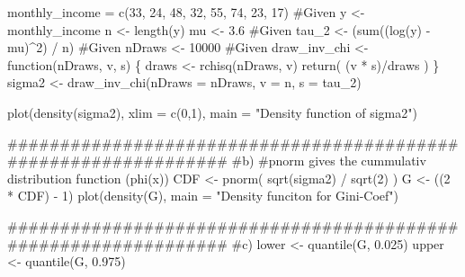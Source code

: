 \documentclass[
]{article}
\author{}
\date{\vspace{-2.5em}}
\newenvironment{Shaded}{\begin{snugshade}}{\end{snugshade}}
\newcommand{\NormalTok}[1]{#1}
\begin{document}
\begin{Shaded}
\begin{Highlighting}[]
\NormalTok{monthly\_income = c(33, 24, 48, 32, 55, 74, 23, 17) \#Given}
\NormalTok{y \textless{}{-} monthly\_income}
\NormalTok{n \textless{}{-} length(y)}
\NormalTok{mu \textless{}{-} 3.6 \#Given}
\NormalTok{tau\_2 \textless{}{-} (sum((log(y) {-} mu)\^{}2) / n) \#Given}
\NormalTok{nDraws \textless{}{-} 10000 \#Given}
\NormalTok{draw\_inv\_chi \textless{}{-} function(nDraws, v, s)}
\NormalTok{\{}
\NormalTok{    draws \textless{}{-} rchisq(nDraws, v)}
\NormalTok{    return( (v * s)/draws )}
\NormalTok{\}}
\NormalTok{sigma2 \textless{}{-} draw\_inv\_chi(nDraws = nDraws, v = n, s = tau\_2)}

\NormalTok{plot(density(sigma2), xlim = c(0,1),}
\NormalTok{     main = "Density function of sigma2")}

\NormalTok{\#\#\#\#\#\#\#\#\#\#\#\#\#\#\#\#\#\#\#\#\#\#\#\#\#\#\#\#\#\#\#\#\#\#\#\#\#\#\#\#\#\#\#\#\#\#\#\#\#\#\#\#\#\#\#\#\#\#\#\#\#\#\#\#}
\NormalTok{\#b)}
\NormalTok{\#pnorm gives the cummulativ distribution function (phi(x))}
\NormalTok{CDF \textless{}{-} pnorm( sqrt(sigma2) / sqrt(2) )}
\NormalTok{G \textless{}{-} ((2 * CDF) {-} 1)}
\NormalTok{plot(density(G), main = "Density funciton for Gini{-}Coef")}


\NormalTok{\#\#\#\#\#\#\#\#\#\#\#\#\#\#\#\#\#\#\#\#\#\#\#\#\#\#\#\#\#\#\#\#\#\#\#\#\#\#\#\#\#\#\#\#\#\#\#\#\#\#\#\#\#\#\#\#\#\#\#\#\#\#\#\#}
\NormalTok{\#c)}
\NormalTok{lower \textless{}{-} quantile(G, 0.025)}
\NormalTok{upper \textless{}{-} quantile(G, 0.975)}


\end{Highlighting}
\end{Shaded}
\end{document}
